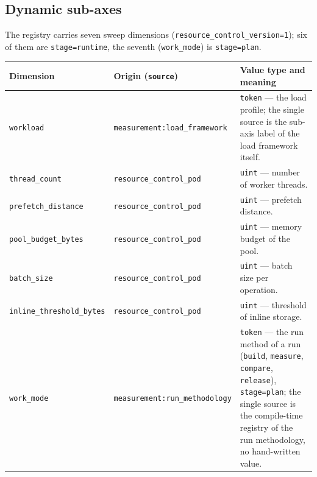 \subsection*{Dynamic sub-axes}

The registry carries seven sweep dimensions (\texttt{resource\_\allowbreak{}control\_\allowbreak{}version=1}); six of them are \texttt{stage=runtime}, the seventh (\texttt{work\_\allowbreak{}mode}) is \texttt{stage=plan}.

\begin{scriptsize}
\begin{longtable}{@{}>{\raggedright\arraybackslash}p{3.6cm} >{\raggedright\arraybackslash}p{4.4cm} >{\raggedright\arraybackslash}p{5.5cm}@{}}
\toprule
Dimension & Origin (\texttt{source}) & Value type and meaning \\
\midrule
\endhead%
\texttt{workload} & \texttt{measurement:\allowbreak{}load\_\allowbreak{}framework} & \texttt{token} --- the load profile; the single source is the sub-axis label of the load framework itself. \\
\texttt{thread\_\allowbreak{}count} & \texttt{resource\_\allowbreak{}control\_\allowbreak{}pod} & \texttt{uint} --- number of worker threads. \\
\texttt{prefetch\_\allowbreak{}distance} & \texttt{resource\_\allowbreak{}control\_\allowbreak{}pod} & \texttt{uint} --- prefetch distance. \\
\texttt{pool\_\allowbreak{}budget\_\allowbreak{}bytes} & \texttt{resource\_\allowbreak{}control\_\allowbreak{}pod} & \texttt{uint} --- memory budget of the pool. \\
\texttt{batch\_\allowbreak{}size} & \texttt{resource\_\allowbreak{}control\_\allowbreak{}pod} & \texttt{uint} --- batch size per operation. \\
\texttt{inline\_\allowbreak{}threshold\_\allowbreak{}bytes} & \texttt{resource\_\allowbreak{}control\_\allowbreak{}pod} & \texttt{uint} --- threshold of inline storage. \\
\texttt{work\_\allowbreak{}mode} & \texttt{measurement:\allowbreak{}run\_\allowbreak{}methodology} & \texttt{token} --- the run method of a run (\texttt{build}, \texttt{measure}, \texttt{compare}, \texttt{release}), \texttt{stage=plan}; the single source is the compile-time registry of the run methodology, no hand-written value. \\
\bottomrule
\end{longtable}
\end{scriptsize}

